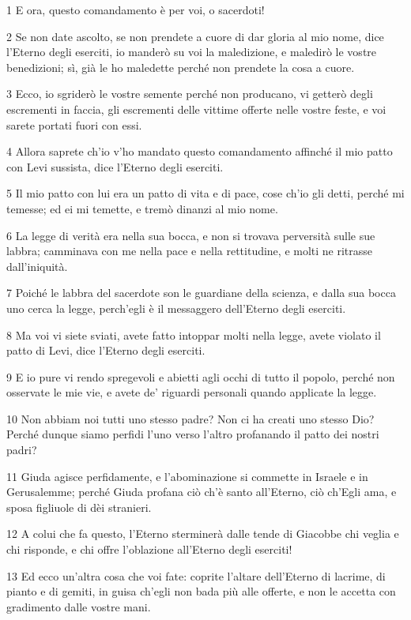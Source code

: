 \par 1 E ora, questo comandamento è per voi, o sacerdoti!
\par 2 Se non date ascolto, se non prendete a cuore di dar gloria al mio nome, dice l'Eterno degli eserciti, io manderò su voi la maledizione, e maledirò le vostre benedizioni; sì, già le ho maledette perché non prendete la cosa a cuore.
\par 3 Ecco, io sgriderò le vostre semente perché non producano, vi getterò degli escrementi in faccia, gli escrementi delle vittime offerte nelle vostre feste, e voi sarete portati fuori con essi.
\par 4 Allora saprete ch'io v'ho mandato questo comandamento affinché il mio patto con Levi sussista, dice l'Eterno degli eserciti.
\par 5 Il mio patto con lui era un patto di vita e di pace, cose ch'io gli detti, perché mi temesse; ed ei mi temette, e tremò dinanzi al mio nome.
\par 6 La legge di verità era nella sua bocca, e non si trovava perversità sulle sue labbra; camminava con me nella pace e nella rettitudine, e molti ne ritrasse dall'iniquità.
\par 7 Poiché le labbra del sacerdote son le guardiane della scienza, e dalla sua bocca uno cerca la legge, perch'egli è il messaggero dell'Eterno degli eserciti.
\par 8 Ma voi vi siete sviati, avete fatto intoppar molti nella legge, avete violato il patto di Levi, dice l'Eterno degli eserciti.
\par 9 E io pure vi rendo spregevoli e abietti agli occhi di tutto il popolo, perché non osservate le mie vie, e avete de' riguardi personali quando applicate la legge.
\par 10 Non abbiam noi tutti uno stesso padre? Non ci ha creati uno stesso Dio? Perché dunque siamo perfidi l'uno verso l'altro profanando il patto dei nostri padri?
\par 11 Giuda agisce perfidamente, e l'abominazione si commette in Israele e in Gerusalemme; perché Giuda profana ciò ch'è santo all'Eterno, ciò ch'Egli ama, e sposa figliuole di dèi stranieri.
\par 12 A colui che fa questo, l'Eterno sterminerà dalle tende di Giacobbe chi veglia e chi risponde, e chi offre l'oblazione all'Eterno degli eserciti!
\par 13 Ed ecco un'altra cosa che voi fate: coprite l'altare dell'Eterno di lacrime, di pianto e di gemiti, in guisa ch'egli non bada più alle offerte, e non le accetta con gradimento dalle vostre mani.
